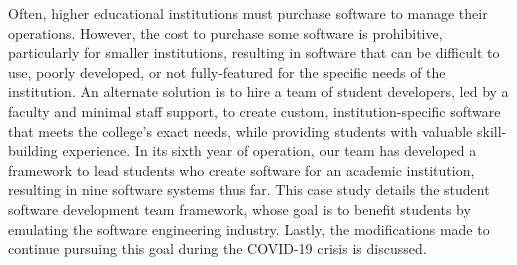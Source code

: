 Often, higher educational institutions must purchase software to manage their operations. However, the cost to purchase some software is prohibitive, particularly for smaller institutions, resulting in software that can be difficult to use, poorly developed, or not fully-featured for the specific needs of the institution. An alternate solution is to hire a team of student developers, led by a faculty and minimal staff support, to create custom, institution-specific software that meets the college's exact needs, while providing students with valuable skill-building experience. In its sixth year of operation, our team has developed a framework to lead students who create software for an academic institution, resulting in nine software systems thus far. This case study details the student software development team framework, whose goal is to benefit students by emulating the software engineering industry. Lastly, the modifications made to continue pursuing this goal during the COVID-19 crisis is discussed.
